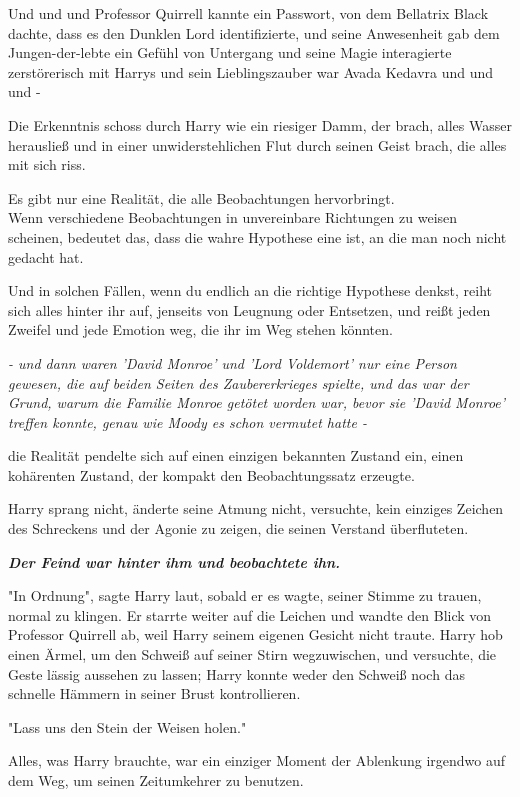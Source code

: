 {Und und und Professor Quirrell kannte ein Passwort, von dem Bellatrix Black dachte, dass es den Dunklen Lord identifizierte, und seine Anwesenheit gab dem Jungen-der-lebte ein Gefühl von Untergang und seine Magie interagierte zerstörerisch mit Harrys und sein Lieblingszauber war Avada Kedavra und und und -

Die Erkenntnis schoss durch Harry wie ein riesiger Damm, der brach, alles Wasser herausließ und in einer unwiderstehlichen Flut durch seinen Geist brach, die alles mit sich riss.

Es gibt nur eine Realität, die alle Beobachtungen hervorbringt.\\ Wenn verschiedene Beobachtungen in unvereinbare Richtungen zu weisen scheinen, bedeutet das, dass die wahre Hypothese eine ist, an die man noch nicht gedacht hat.

Und in solchen Fällen, wenn du endlich an die richtige Hypothese denkst, reiht sich alles hinter ihr auf, jenseits von Leugnung oder Entsetzen, und reißt jeden Zweifel und jede Emotion weg, die ihr im Weg stehen könnten.

\emph{- und dann waren 'David Monroe' und 'Lord Voldemort' nur eine Person gewesen, die auf beiden Seiten des Zaubererkrieges spielte, und das war der Grund, warum die Familie Monroe getötet worden war, bevor sie 'David Monroe' treffen konnte, genau wie Moody es schon vermutet hatte -}

die Realität pendelte sich auf einen einzigen bekannten Zustand ein, einen kohärenten Zustand, der kompakt den Beobachtungssatz erzeugte.

Harry sprang nicht, änderte seine Atmung nicht, versuchte, kein einziges Zeichen des Schreckens und der Agonie zu zeigen, die seinen Verstand überfluteten.

\textbf{\emph{Der Feind war hinter ihm und beobachtete ihn.}}

"In Ordnung", sagte Harry laut, sobald er es wagte, seiner Stimme zu trauen, normal zu klingen. Er starrte weiter auf die Leichen und wandte den Blick von Professor Quirrell ab, weil Harry seinem eigenen Gesicht nicht traute. Harry hob einen Ärmel, um den Schweiß auf seiner Stirn wegzuwischen, und versuchte, die Geste lässig aussehen zu lassen; Harry konnte weder den Schweiß noch das schnelle Hämmern in seiner Brust kontrollieren.

"Lass uns den Stein der Weisen holen."

Alles, was Harry brauchte, war ein einziger Moment der Ablenkung irgendwo auf dem Weg, um seinen Zeitumkehrer zu benutzen.

}
